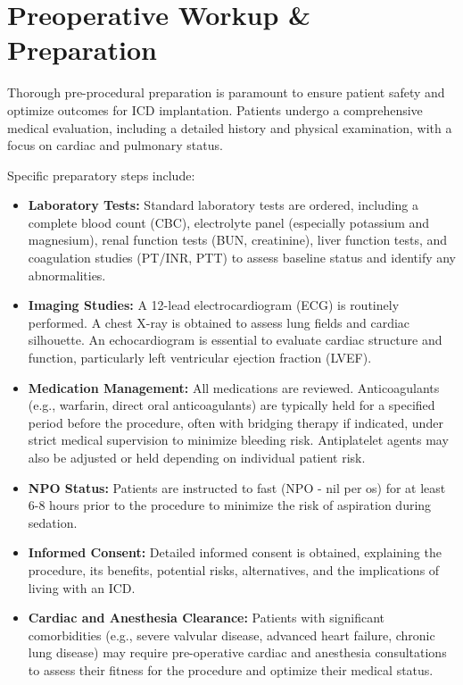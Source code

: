 \section*{Preoperative Workup \& Preparation}
Thorough pre-procedural preparation is paramount to ensure patient safety and optimize outcomes for ICD implantation. Patients undergo a comprehensive medical evaluation, including a detailed history and physical examination, with a focus on cardiac and pulmonary status.

Specific preparatory steps include:

\begin{itemize}
  \item \textbf{Laboratory Tests:} Standard laboratory tests are ordered, including a complete blood count (CBC), electrolyte panel (especially potassium and magnesium), renal function tests (BUN, creatinine), liver function tests, and coagulation studies (PT/INR, PTT) to assess baseline status and identify any abnormalities.
  
  \item \textbf{Imaging Studies:} A 12-lead electrocardiogram (ECG) is routinely performed. A chest X-ray is obtained to assess lung fields and cardiac silhouette. An echocardiogram is essential to evaluate cardiac structure and function, particularly left ventricular ejection fraction (LVEF).
  
  \item \textbf{Medication Management:} All medications are reviewed. Anticoagulants (e.g., warfarin, direct oral anticoagulants) are typically held for a specified period before the procedure, often with bridging therapy if indicated, under strict medical supervision to minimize bleeding risk. Antiplatelet agents may also be adjusted or held depending on individual patient risk.
  
  \item \textbf{NPO Status:} Patients are instructed to fast (NPO - nil per os) for at least 6-8 hours prior to the procedure to minimize the risk of aspiration during sedation.
  
  \item \textbf{Informed Consent:} Detailed informed consent is obtained, explaining the procedure, its benefits, potential risks, alternatives, and the implications of living with an ICD.
  
  \item \textbf{Cardiac and Anesthesia Clearance:} Patients with significant comorbidities (e.g., severe valvular disease, advanced heart failure, chronic lung disease) may require pre-operative cardiac and anesthesia consultations to assess their fitness for the procedure and optimize their medical status.
  

\end{itemize}
